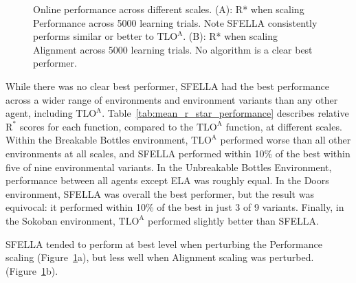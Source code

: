 \begin{figure}
  \caption{Online performance across different scales. (A): R* when scaling Performance across 5000 learning trials. Note SFELLA consistently performs similar or better to $\text{TLO}^\text{A}$. (B): R* when scaling Alignment across 5000 learning trials. No algorithm is a clear best performer.%
  }
   \label{fig:online_performance}
 \end{figure}

While there was no clear best performer, SFELLA had the best performance across a wider range of environments and environment variants than any other agent, including  $\text{TLO}^\text{A}$. Table~\ref{tab:mean_r_star_performance} describes relative $\text{R}^*$ scores for each function, compared to the $\text{TLO}^\text{A}$ function, at different scales.  Within the Breakable Bottles environment, $\text{TLO}^\text{A}$ performed worse than all other environments at all scales, and SFELLA performed within 10\% of the best within five of nine environmental variants. In the Unbreakable Bottles Environment, performance between all agents except ELA was roughly equal. In the Doors environment, SFELLA was overall the best performer, but the result was equivocal: it performed within 10\% of the best in just 3 of 9 variants. Finally, in the Sokoban environment, $\text{TLO}^\text{A}$ performed slightly better than SFELLA.

SFELLA tended to perform at best level when perturbing the Performance scaling (Figure~\ref{fig:online_performance}a), but less well when Alignment scaling was perturbed. (Figure~\ref{fig:online_performance}b).